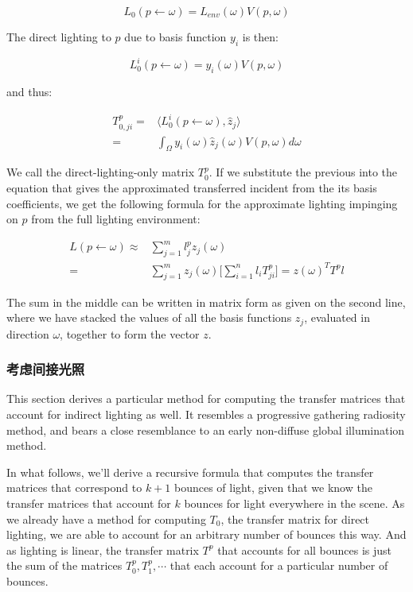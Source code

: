 \begin{equation*}
	L_0(p\leftarrow\omega)=L_{env}(\omega)V(p,\omega)
\end{equation*}

The direct lighting to $p$ due to basis function $y_i$ is then:

\begin{equation*}
	L^{i}_0(p\leftarrow\omega)=y_i(\omega)V(p,\omega)
\end{equation*}

and thus:

\begin{equation*}
\begin{aligned}
	T^{p}_{0,ji}=&\langle L^{i}_0(p\leftarrow\omega),\hat{z}_j\rangle \\
	=&\int_\Omega y_i(\omega)\hat{z}_j(\omega)V(p,\omega)d\omega
\end{aligned}
\end{equation*}

We call the direct-lighting-only matrix $T^{p}_0$. If we substitute the previous into the equation that gives the approximated transferred incident from the its basis coefficients, we get the following formula for the approximate lighting impinging on $p$ from the full lighting environment:

\begin{equation*}
\begin{aligned}
	L(p\leftarrow\omega)\approx &\sum^{m}_{j=1}l^{p}_{j}z_j(\omega)\\
	=&\sum^{m}_{j=1}z_j(\omega)\Biggr[ \sum^{n}_{i=1}l_iT^{p}_{ji}  \Biggr]
	=z(\omega)^{T}T^{p}l
\end{aligned}
\end{equation*} 

The sum in the middle can be written in matrix form as given on the second line, where we have stacked the values of all the basis functions $z_j$, evaluated in direction $\omega$, together to form the vector $z$.




\subsubsection{考虑间接光照}
This section derives a particular method for computing the transfer matrices that account for indirect lighting as well. It resembles a progressive gathering radiosity method, and bears a close resemblance to an early non-diffuse global illumination method.

In what follows, we'll derive a recursive formula that computes the transfer matrices that correspond to $k+1$ bounces of light, given that we know the transfer matrices that account for $k$ bounces for light everywhere in the scene. As we already have a method for computing $T_0$, the transfer matrix for direct lighting, we are able to account for an arbitrary number of bounces this way. And as lighting is linear, the transfer matrix $T^{p}$ that accounts for all bounces is just the sum of the matrices $T^{p}_0,T^{p}_1,\cdots$ that each account for a particular number of bounces.

